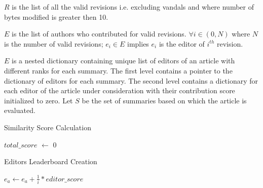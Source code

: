 \documentclass[12pt]{article}
\begin{document}
$R$ is the list of all the valid revisions i.e. excluding vandals and where number of bytes modified is greater then 10.

$E$ is the list of authors who contributed for valid revisions.
$\forall i \in (0, N)$ where $N$ is the number of valid revisions; $e_i \in E$ implies $e_i$ is the editor of $i^{th}$ revision.



$E$ is a nested dictionary containing unique list of editors of an article with different ranks for each summary. The first level contains a pointer to the dictionary of editors for each summary. The second level contains a dictionary for each editor of the article under consideration with their contribution score initialized to zero.
Let $S$ be the set of summaries based on which the article is evaluated.


\begin{algorithm}[H] 
\caption{Similarity Score Calculation}
\label{alg:sim_score}
\begin{algorithmic}[1]
\Statex
{} %
	\State $total\_score$ $\gets$ $0$
    \EndFor
    \State {}	
\EndFunction
\end{algorithmic}
\end{algorithm}


\begin{algorithm}[H] 
\caption{Editors Leaderboard Creation}
\label{alg:Leaderboard}
\begin{algorithmic}[1]
\Statex
{}
         	\Else
        	\EndIf
        	\State $e_a \gets e_a + \frac{1}{i} * editor\_score$ 
        \EndFor
    \EndFor
    \State {}
\EndFunction
\end{algorithmic}
\end{algorithm}
\end{document}
